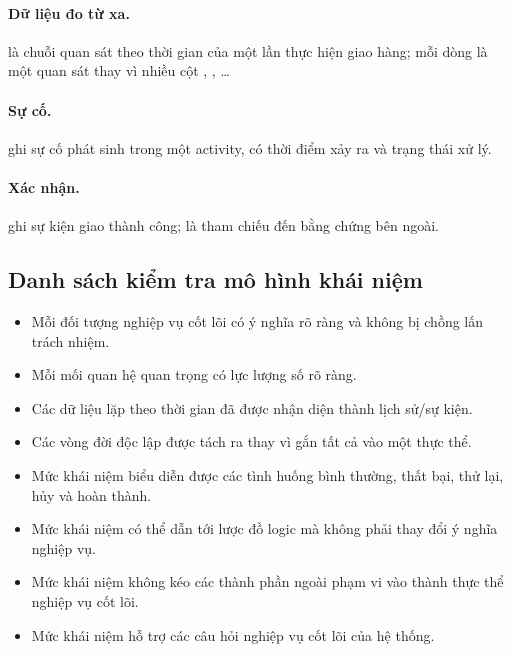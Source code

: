 \paragraph{Dữ liệu đo từ xa.}
 là chuỗi quan sát theo thời gian của một lần thực hiện giao hàng; mỗi dòng là một quan sát thay vì nhiều cột , , \ldots

\paragraph{Sự cố.}
 ghi sự cố phát sinh trong một activity, có thời điểm xảy ra và trạng thái xử lý.

\paragraph{Xác nhận.}
 ghi sự kiện giao thành công;  là tham chiếu đến bằng chứng bên ngoài.

\subsection{Danh sách kiểm tra mô hình khái niệm}

\begin{itemize}
    \item Mỗi đối tượng nghiệp vụ cốt lõi có ý nghĩa rõ ràng và không bị chồng lấn trách nhiệm.
    \item Mỗi mối quan hệ quan trọng có lực lượng số rõ ràng.
    \item Các dữ liệu lặp theo thời gian đã được nhận diện thành lịch sử/sự kiện.
    \item Các vòng đời độc lập được tách ra thay vì gắn tất cả vào một thực thể.
    \item Mức khái niệm biểu diễn được các tình huống bình thường, thất bại, thử lại, hủy và hoàn thành.
    \item Mức khái niệm có thể dẫn tới lược đồ logic mà không phải thay đổi ý nghĩa nghiệp vụ.
    \item Mức khái niệm không kéo các thành phần ngoài phạm vi vào thành thực thể nghiệp vụ cốt lõi.
    \item Mức khái niệm hỗ trợ các câu hỏi nghiệp vụ cốt lõi của hệ thống.
\end{itemize}

